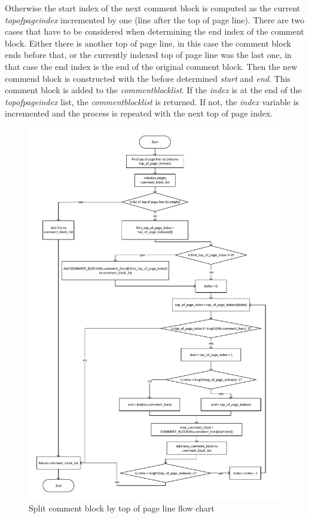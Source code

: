 Otherwise the start index of the next comment block is computed as the current \textit{top\textunderscore of\textunderscore page\textunderscore index} incremented by one (line after the top of page line).
There are two cases that have to be considered when determining the end index of the comment block.
Either there is another top of page line, in this case the comment block ends before that, or the currently indexed top of page line was the last one, in that case the end index is the end of the original comment block.
Then the new commend block is constructed with the before determined \textit{start} and \textit{end}.
This comment block is added to the \textit{comment\textunderscore block\textunderscore list}.
If the \textit{index} is at the end of the \textit{top\textunderscore of\textunderscore page\textunderscore index} list, the \textit{comment\textunderscore block\textunderscore list} is returned. If not, the \textit{index} variable is incremented and the process is repeated with the next top of page index.

\begin{figure}[H]
\centering
\includegraphics[width=1\textwidth]{images/Implementation_split_comment_by_top_of_page.pdf}
\caption{Split comment block by top of page line flow chart}
\label{fig:ImplementationMaintainingCommentSplitByTopOfPage}
\end{figure}

